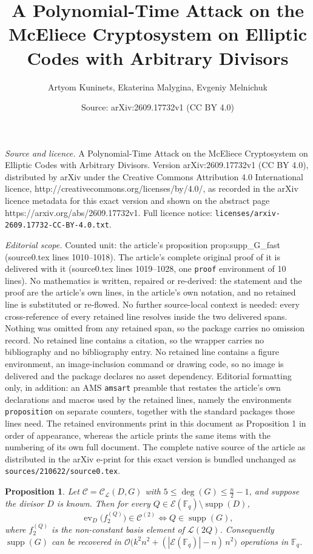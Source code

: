 \documentclass[10pt,a4paper]{amsart}
\title{A Polynomial-Time Attack on the McEliece Cryptosystem on Elliptic Codes with Arbitrary Divisors}
\author{Artyom Kuninets, Ekaterina Malygina, Evgeniy Melnichuk}
\date{Source: arXiv:2609.17732v1 (CC BY 4.0)}
\newtheorem{proposition}{Proposition}
\newcommand{\FF}{\ensuremath{\mathbb{F}}}
\begin{document}
\maketitle

\noindent\emph{Source and licence.} A Polynomial-Time Attack on the McEliece Cryptosystem on Elliptic Codes with Arbitrary Divisors. Version arXiv:2609.17732v1 (CC BY 4.0), distributed by arXiv under the Creative Commons Attribution 4.0 International licence, http://creativecommons.org/licenses/by/4.0/, as recorded in the arXiv licence metadata for this exact version and shown on the abstract page https://arxiv.org/abs/2609.17732v1. Full licence notice: \texttt{licenses/arxiv-2609.17732-CC-BY-4.0.txt}.\par\smallskip

\noindent\textit{Editorial scope.} Counted unit: the article's proposition prop:supp\_G\_fast (source0.tex lines 1010--1018). The article's complete original proof of it is delivered with it (source0.tex lines 1019--1028, one \texttt{proof} environment of 10 lines). No mathematics is written, repaired or re-derived: the statement and the proof are the article's own lines, in the article's own notation, and no retained line is substituted or re-flowed.  No further source-local context is needed: every cross-reference of every retained line resolves inside the two delivered spans.  Nothing was omitted from any retained span, so the package carries no omission record.  No retained line contains a citation, so the wrapper carries no bibliography and no bibliography entry.  No retained line contains a figure environment, an image-inclusion command or drawing code, so no image is delivered and the package declares no asset dependency.  Editorial formatting only, in addition: an AMS \texttt{amsart} preamble that restates the article's own declarations and macros used by the retained lines, namely the environments \texttt{proposition} on separate counters, together with the standard packages those lines need.  The retained environments print in this document as Proposition 1 in order of appearance, whereas the article prints the same items with the numbering of its own full document.  The complete native source of the article as distributed in the arXiv e-print for this exact version is bundled unchanged as \texttt{sources/210622/source0.tex}.
\begin{proposition}\label{prop:supp_G_fast}
Let $\mathcal{C} = \mathcal{C}_\mathscr{L}(D,G)$ with $5 \leq \deg(G) \leq \frac{n}{2}-1$, and suppose the divisor $D$ is known. Then for every $Q \in \mathcal{E}(\FF_q) \setminus \operatorname{supp}(D)$,
\[
\operatorname{ev}_D\bigl(f_2^{(Q)}\bigr) \in \mathcal{C}^{(2)}
\iff
Q \in \operatorname{supp}(G),
\]
where $f_2^{(Q)}$ is the non-constant basis element of $\mathscr{L}(2Q)$. Consequently $\operatorname{supp}(G)$ can be recovered in $\mathcal{O}\bigl(k^2n^2 + (|\mathcal{E}(\FF_q)|-n)\,n^2\bigr)$ operations in $\FF_q$.
\end{proposition}
\end{document}
